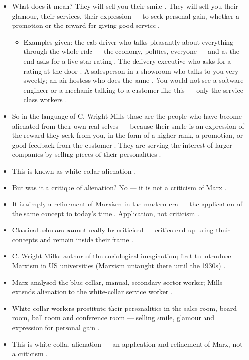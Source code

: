 \begin{itemize}
    \item What does it mean? They will sell you their smile . They will sell you their glamour, their services, their expression --- to seek personal gain, whether a promotion or the reward for giving good service .
    \begin{itemize}
        \item Examples given: the cab driver who talks pleasantly about everything through the whole ride --- the economy, politics, everyone --- and at the end asks for a five-star rating . The delivery executive who asks for a rating at the door . A salesperson in a showroom who talks to you very sweetly; an air hostess who does the same . You would not see a software engineer or a mechanic talking to a customer like this --- only the service-class workers .
    \end{itemize}
    \item So in the language of C. Wright Mills these are the people who have become alienated from their own real selves --- because their smile is an expression of the reward they seek from you, in the form of a higher rank, a promotion, or good feedback from the customer . They are serving the interest of larger companies by selling pieces of their personalities .
    \item This is known as white-collar alienation .
\end{itemize}

\begin{CriticalPoint}
\begin{itemize}
    \item But was it a critique of alienation? No --- it is not a criticism of Marx .
    \item It is simply a refinement of Marxism in the modern era --- the application of the same concept to today's time . Application, not criticism .
\end{itemize}
\end{CriticalPoint}

\begin{QuickRevision}
\begin{itemize}
    \item Classical scholars cannot really be criticised --- critics end up using their concepts and remain inside their frame .
    \item C. Wright Mills: author of the sociological imagination; first to introduce Marxism in US universities (Marxism untaught there until the 1930s) .
    \item Marx analysed the blue-collar, manual, secondary-sector worker; Mills extends alienation to the white-collar service worker .
    \item White-collar workers prostitute their personalities in the sales room, board room, ball room and conference room --- selling smile, glamour and expression for personal gain .
    \item This is white-collar alienation --- an application and refinement of Marx, not a criticism .
\end{itemize}
\end{QuickRevision}

